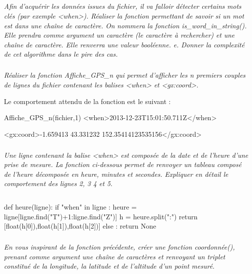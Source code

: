 \documentclass[10pt,oneside]{article}
\begin{document}
\subparagraph{}
\textit{Afin d'acquérir les données issues du fichier, il va falloir détecter certains mots clés (par exemple \textsf{<when>}). Réaliser la fonction permettant de savoir si  un mot est dans une chaîne de caractère. On nommera la fonction \textsf{is\_word\_in\_string()}. Elle prendra comme argument un caractère (le caractère à rechercher) et une chaîne de caractère. Elle renverra une valeur booléenne.
e. Donner la complexité de cet algorithme dans le pire des cas.}


\subparagraph{}
\textit{Réaliser la fonction \textsf{Affiche\_GPS\_n} qui permet d'afficher les n premiers couples de lignes du fichier contenant les balises \textsf{<when>} et \textsf{<gx:coord>}.}
\begin{exemple}
Le comportement attendu de la fonction est le suivant :
\begin{py}
\begin{python}
Affiche_GPS_n(fichier,1)
    <when>2013-12-23T15:01:50.711Z</when>
    
    <gx:coord>-1.659413 43.331232 152.35414123535156</gx:coord>
    
\end{python}
\end{py}
\end{exemple}


\subparagraph{}
\textit{Une ligne contenant la balise \textsf{<when>} est composée de la date et de l'heure d'une prise de mesure. La fonction ci-dessous permet de renvoyer un tableau composé de l'heure décomposée en heure, minutes et secondes. Expliquer en détail le comportement des lignes 2, 3 4 et 5.}

\begin{py}
\begin{minipage}[c]{.1\linewidth}
$$ $$
\end{minipage}\hfill
\begin{minipage}[c]{.8\linewidth}
\begin{python_nb}
def heure(ligne):
    if "when" in ligne :
        heure = ligne[ligne.find("T")+1:ligne.find("Z")]
        h = heure.split(":")
        return [float(h[0]),float(h[1]),float(h[2])]
    else :
        return None
\end{python_nb}
\end{minipage}
\end{py}


\subparagraph{}
\textit{En vous inspirant de la fonction précédente, créer une fonction \textsf{coordonnée()}, prenant comme argument une chaîne de caractères et renvoyant un triplet constitué de la longitude, la latitude et de l'altitude d'un point mesuré.}
\end{document}
